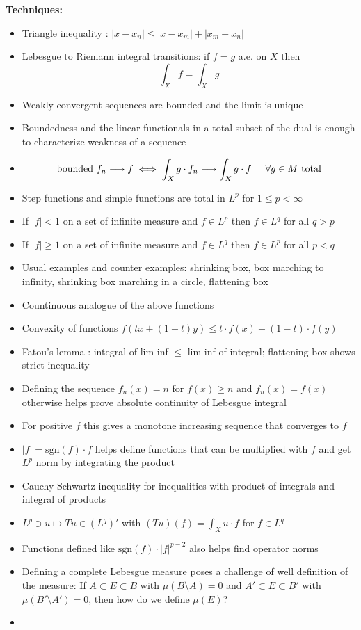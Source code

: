 \documentclass[12pt]{article}
\begin{document}
\newpage
\textbf{Techniques:}
\vspace*{2mm}
\begin{itemize}
    \item Triangle inequality : $|x-x_n|\leq|x-x_m|+|x_m-x_n|$
    \item Lebesgue to Riemann integral transitions: if $f=g$ a.e. on $X$ then
        $$\int_X{f}=\int_X{g}$$
    \item Weakly convergent sequences are bounded and the limit is unique
    \item Boundedness and the linear functionals in a total subset of the dual is enough to characterize weakness of a sequence
    \item $$\text{bounded }f_n\longrightarrow f \iff{\int_X{g\cdot f_n}}\longrightarrow\int_X{g\cdot f}\hspace*{5mm}\forall g\in M \text{ total}$$
    \item Step functions and simple functions are total in $L^p$ for $1\leq p<\infty$
    \item If $|f|<1$ on a set of infinite measure and $f\in L^p$ then $f\in L^q$ for all $q>p$
    \item If $|f|\geq 1$ on a set of infinite measure and $f\in L^q$ then $f\in L^p$ for all $p<q$
    \item Usual examples and counter examples: shrinking box, box marching to infinity, shrinking box marching in a circle, flattening box
    \item Countinuous analogue of the above functions
    \item Convexity of functions $f(tx+(1-t)y)\leq t\cdot f(x)+(1-t)\cdot f(y)$
    \item Fatou's lemma : integral of lim inf $\leq$ lim inf of integral; flattening box shows strict inequality
    \item Defining the sequence $f_n(x)=n$ for $f(x)\geq n$ and $f_n(x)=f(x)$ otherwise helps prove absolute continuity of Lebesgue integral
    \item For positive $f$ this gives a monotone increasing sequence that converges to $f$
    \item $|f|=\text{sgn}(f)\cdot f$ helps define functions that can be multiplied with $f$ and get $L^p$ norm by integrating the product
    \item Cauchy-Schwartz inequality for inequalities with product of integrals and integral of products
    \item $L^p\ni u\mapsto Tu\in (L^q)'$ with $\displaystyle(Tu)(f)=\int_X{u\cdot f}$ for $f\in L^q$
    \item Functions defined like $\text{sgn}(f)\cdot|f|^{p-2}$ also helps find operator norms
    \item Defining a complete Lebesgue measure poses a challenge of well definition of the measure: If $A\subset E\subset B$ with $\mu(B\setminus A)=0$
        and $A'\subset E\subset B'$ with $\mu(B'\setminus A')=0$, then how do we define $\mu(E)$?
    \item
\end{itemize}
\end{document}
